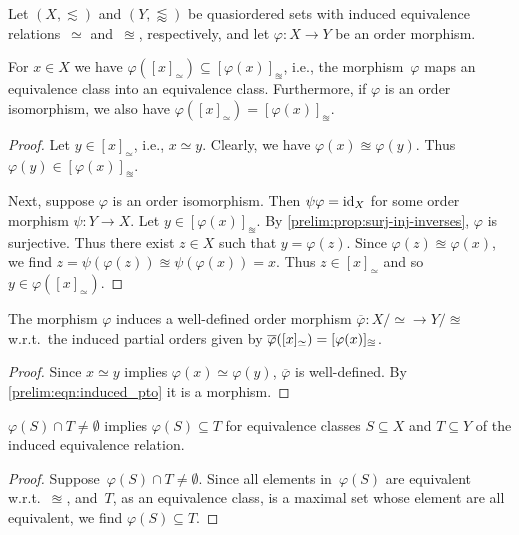 
Let $(X, \lesssim)$ and $(Y, \lessapprox)$ be quasiordered sets 
with induced equivalence relations~$\simeq$ and~$\approxeq$, respectively,
and let $\varphi \colon X \to Y$ be an order morphism.

\begin{proposition} \label{prelim:prop:morphism_equiv_class}
	For $x \in X$ we have $\varphi([x]_{\simeq}) \subseteq [\varphi(x)]_{\approxeq}$,
	i.e., the morphism~$\varphi$ maps an equivalence class into an equivalence class.
	Furthermore, if $\varphi$ is an order isomorphism,
	we also have $\varphi([x]_{\simeq}) = [\varphi(x)]_{\approxeq}$.
\end{proposition}
\begin{proof}
	Let $y \in [x]_{\simeq}$, i.e., $x \simeq y$.
	Clearly, we have $\varphi(x) \approxeq \varphi(y)$.
	Thus $\varphi(y) \in [\varphi(x)]_{\approxeq}$.
	
	Next, suppose $\varphi$ is an order isomorphism.
	Then $\psi \varphi = \operatorname{id}_X$
	for some order morphism $\psi \colon Y \to X$.
	Let $y \in [\varphi(x)]_{\approxeq}$.
	By \cref{prelim:prop:surj-inj-inverses}, 
	$\varphi$ is surjective.	
	Thus there exist $z \in X$ such that $y = \varphi(z)$.
	Since $\varphi(z) \approxeq \varphi(x)$,
	we find $z = \psi(\varphi(z)) \approxeq \psi(\varphi(x)) = x$.
	Thus $z \in [x]_{\simeq}$
	and so $y \in \varphi([x]_{\simeq})$.
\end{proof}

\begin{proposition} \label{prelim:prop:morphism_on_induced_pto} 
	The morphism $\varphi$ induces a well-defined order morphism $\overline{\varphi} \colon X / {\simeq} \to Y / {\approxeq}$
	w.r.t.~the induced partial 
	orders given by $\overline{\varphi}([x]_{\simeq}) = [\varphi(x)]_{\approxeq}$.
\end{proposition}
\begin{proof}
 Since $x \simeq y$ implies $\varphi(x) \simeq \varphi(y)$,
 $\overline{\varphi}$ is well-defined.
 By \cref{prelim:eqn:induced_pto} it is a morphism.	
\end{proof}

\begin{proposition} \label{prelim:general:order:prop:equiv-class-image-disjoint-or-subset}
	$\varphi(S) \cap T \ne \emptyset$ implies $\varphi(S) \subseteq T$ for equivalence classes $S \subseteq X$ and $T \subseteq Y$
	of the induced equivalence relation.
\end{proposition} 
\begin{proof}
		Suppose~$\varphi(S) \cap T \ne \emptyset$.
		Since all elements in~$\varphi(S)$ are equivalent w.r.t.~$\approxeq$,
		and~$T$, as an equivalence class, is a maximal set whose element are all equivalent,
		we find $\varphi(S) \subseteq T$.	
\end{proof}

